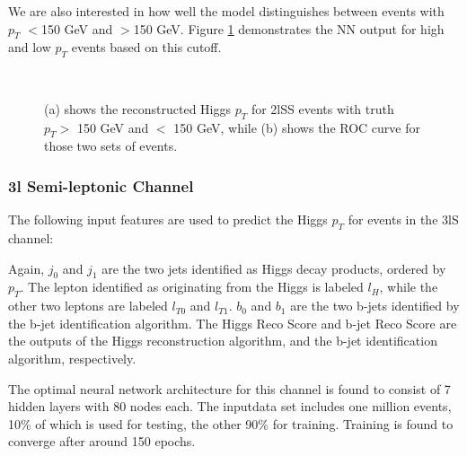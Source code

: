 We are also interested in how well the model distinguishes between events with $p_T$ $<$150 GeV and $>$150 GeV. Figure \ref{fig:pt2lSSroc} demonstrates the NN output for high and low $p_T$ events based on this cutoff.

\begin{figure}[h!]                                                                                                    
    \\
    \caption{(a) shows the reconstructed Higgs $p_T$ for 2lSS events with truth $p_T > $ 150 GeV and $<$ 150 GeV, while (b) shows the ROC curve for those two sets of events.}
    \label{fig:pt2lSSroc}
\end{figure}
                                                                                                                            

\subsubsection{3l Semi-leptonic Channel}
\label{subsec:pt3lS}

The following input features are used to predict the Higgs $p_T$ for events in the 3lS channel:



Again, $j_0$ and $j_1$ are the two jets identified as Higgs decay products, ordered by $p_T$. The lepton identified as originating from the Higgs is labeled $l_H$, while the other two leptons are labeled $l_{T0}$ and $l_{T1}$. $b_0$ and $b_1$ are the two b-jets identified by the b-jet identification algorithm. The Higgs Reco Score and b-jet Reco Score are the outputs of the Higgs reconstruction algorithm, and the b-jet identification algorithm, respectively.

The optimal neural network architecture for this channel is found to consist of 7 hidden layers with 80 nodes each. The inputdata set includes one million events, 10\% of which is used for testing, the other 90\% for training. Training is found to converge after around 150 epochs.

